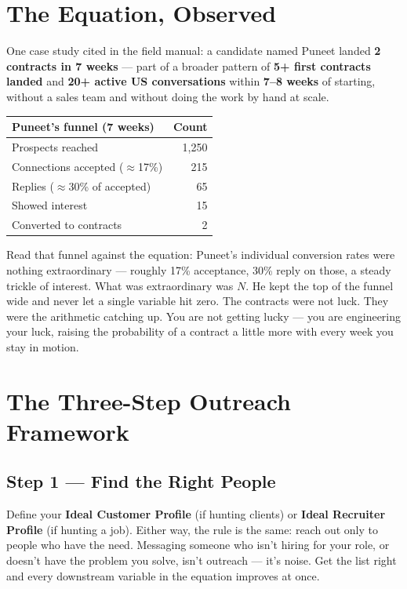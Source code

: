 \section{The Equation, Observed}

One case study cited in the field manual: a candidate named Puneet landed \textbf{2 contracts in 7 weeks} ---
part of a broader pattern of \textbf{5+ first contracts landed} and \textbf{20+ active US conversations} within
\textbf{7--8 weeks} of starting, without a sales team and without doing the work by hand at scale.

\begin{longtable}{p{} r}
\toprule
\textbf{Puneet's funnel (7 weeks)} & \textbf{Count} \\
\midrule
\endhead
Prospects reached & 1{,}250 \\
Connections accepted ($\approx$17\%) & 215 \\
Replies ($\approx$30\% of accepted) & 65 \\
Showed interest & 15 \\
Converted to contracts & 2 \\
\bottomrule
\end{longtable}

\begin{caution}
Read that funnel against the equation: Puneet's individual conversion rates were nothing extraordinary ---
roughly 17\% acceptance, 30\% reply on those, a steady trickle of interest. What was extraordinary was $N$. He
kept the top of the funnel wide and never let a single variable hit zero. The contracts were not luck. They were
the arithmetic catching up. You are not getting lucky --- you are engineering your luck, raising the probability
of a contract a little more with every week you stay in motion.
\end{caution}

\section{The Three-Step Outreach Framework}

\subsection{Step 1 --- Find the Right People}

Define your \textbf{Ideal Customer Profile} (if hunting clients) or \textbf{Ideal Recruiter Profile} (if hunting a
job). Either way, the rule is the same: reach out only to people who have the need. Messaging someone who isn't
hiring for your role, or doesn't have the problem you solve, isn't outreach --- it's noise. Get the list right and
every downstream variable in the equation improves at once.

